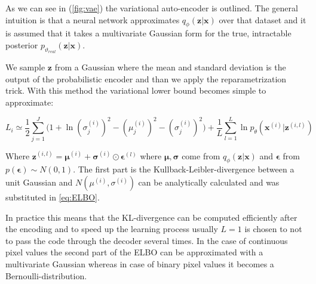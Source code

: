 \documentclass[12pt, english]{article}
\begin{document}
\vspace{4mm}

\par As we can see in (\ref{fig:vae}) the variational auto-encoder is outlined. The general intuition is that a neural network approximates $q_{\phi}(\bm{z} | \bm{x})$ over that dataset and it is assumed that it takes a multivariate Gaussian form for the true, intractable posterior $p_{\vartheta_{real}}(\bm{z} | \bm{x})$.

\vspace{4mm}

\par We sample $\bm{z}$ from a Gaussian where the mean and standard deviation is the output of the probabilistic encoder and than we apply the reparametrization trick. With this method the variational lower bound becomes simple to approximate:

\vspace{4mm}

\begin{equation}
    L_{i} \simeq \frac{1}{2}\sum_{j = 1}^{J}\Big( 1 + \ln(\sigma^{(i)}_{j})^{2} - (\mu^{(i)}_{j})^{2} - (\sigma^{(i)}_{j})^{2} \Big) + \frac{1}{L}\sum_{l=1}^{L}\ln p_{\theta}(\bm{x}^{(i)} | \bm{z}^{(i, l)})
    \label{eq:ELBO}
\end{equation}

\vspace{4mm}

\par Where $\bm{z}^{(i, l)} = \bm{\mu}^{(i)} + \bm{\sigma}^{(i)} \odot \bm{\epsilon}^{(l)}$ where $\bm{\mu}, \bm{\sigma}$ come from $q_{\phi}(\bm{z} | \bm{x})$ and $\bm{\epsilon}$ from $p(\bm{\epsilon}) \sim N(0, 1)$. The first part is the Kullback-Leibler-divergence between a unit Gaussian and $N(\mu^{(i)}, \sigma^{(i)})$ can be analytically calculated and was substituted in \ref{eq:ELBO}.

\vspace{4mm}

\par In practice this means that the KL-divergence can be computed efficiently after the encoding and to speed up the learning process usually $L = 1$ is chosen to not to pass the code through the decoder several times. In the case of continuous pixel values the second part of the ELBO can be approximated with a multivariate Gaussian whereas in case of binary pixel values it becomes a Bernoulli-distribution. 

\vspace{5mm}
\end{document}
